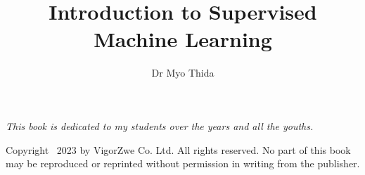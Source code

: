 \documentclass[oneside,11pt]{memoir} %
\title{Introduction to Supervised Machine Learning} %
\author{Dr Myo Thida} %
\newcommand{\edition}{} %
\begin{document}

\thispagestyle{empty} %



\newpage %

\newpage \vspace*{3cm}
\thispagestyle{empty}
\begin{center}
  \Large \emph{This book is dedicated to my students over the years and all the youths.}
\end{center}


\newpage

\vspace*{\fill}
Copyright \textcopyright\ 2023 by VigorZwe Co. Ltd. All rights reserved.
No part of this book may be reproduced or reprinted without permission in writing from the publisher.
\newpage

\end{document}
